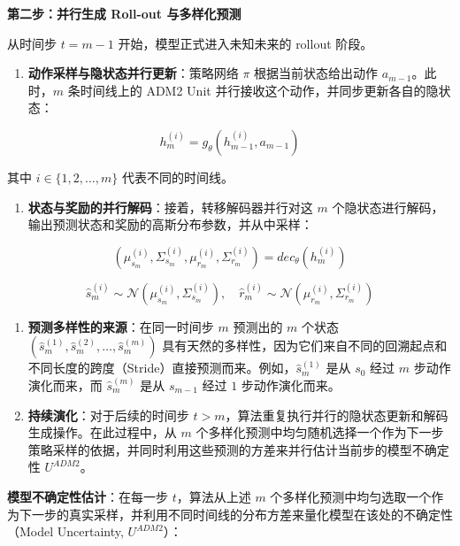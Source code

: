 \textbf{第二步：并行生成 Roll-out 与多样化预测}

从时间步 \(t=m-1\) 开始，模型正式进入未知未来的 rollout 阶段。

\begin{enumerate}
\def\labelenumi{\arabic{enumi}.}
\tightlist
\item
  \textbf{动作采样与隐状态并行更新}：策略网络 \(\pi\) 根据当前状态给出动作 \(a_{m-1}\)。此时，\(m\) 条时间线上的 ADM2 Unit 并行接收这个动作，并同步更新各自的隐状态：
\end{enumerate}

\[
h_m^{(i)}=g_\theta(h_{m-1}^{(i)},a_{m-1})
\]

其中 \(i\in\{1,2,\ldots,m\}\) 代表不同的时间线。

\begin{enumerate}
\def\labelenumi{\arabic{enumi}.}
\setcounter{enumi}{1}
\tightlist
\item
  \textbf{状态与奖励的并行解码}：接着，转移解码器并行对这 \(m\) 个隐状态进行解码，输出预测状态和奖励的高斯分布参数，并从中采样：
\end{enumerate}

\[
(\mu_{s_m}^{(i)},\Sigma_{s_m}^{(i)},\mu_{r_m}^{(i)},\Sigma_{r_m}^{(i)})
=
dec_\theta(h_m^{(i)})
\]

\[
\hat{s}_m^{(i)}\sim\mathcal{N}(\mu_{s_m}^{(i)},\Sigma_{s_m}^{(i)}),
\quad
\hat{r}_m^{(i)}\sim\mathcal{N}(\mu_{r_m}^{(i)},\Sigma_{r_m}^{(i)})
\]

\begin{enumerate}
\def\labelenumi{\arabic{enumi}.}
\setcounter{enumi}{2}
\item
  \textbf{预测多样性的来源}：在同一时间步 \(m\) 预测出的 \(m\) 个状态 \((\hat{s}_m^{(1)},\hat{s}_m^{(2)},\ldots,\hat{s}_m^{(m)})\) 具有天然的多样性，因为它们来自不同的回溯起点和不同长度的跨度（Stride）直接预测而来。例如，\(\hat{s}_m^{(1)}\) 是从 \(s_0\) 经过 \(m\) 步动作演化而来，而 \(\hat{s}_m^{(m)}\) 是从 \(s_{m-1}\) 经过 \(1\) 步动作演化而来。
\item
  \textbf{持续演化}：对于后续的时间步 \(t\gt m\)，算法重复执行并行的隐状态更新和解码生成操作。在此过程中，从 \(m\) 个多样化预测中均匀随机选择一个作为下一步策略采样的依据，并同时利用这些预测的方差来并行估计当前步的模型不确定性 \(U^{ADM2}\)。
\end{enumerate}

\textbf{模型不确定性估计}：在每一步 \(t\)，算法从上述 \(m\) 个多样化预测中均匀选取一个作为下一步的真实采样，并利用不同时间线的分布方差来量化模型在该处的不确定性（Model Uncertainty, \(U^{ADM2}\)）：

